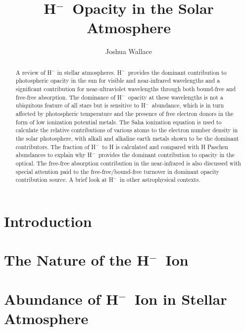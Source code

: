 \documentclass{emulateapj}
\def\h{H$^-$}
\begin{document}
\title{\h\ Opacity in the Solar Atmosphere}

\author{Joshua Wallace}


\begin{abstract}
A review of H$^-$ in stellar atmospheres. \h\ provides the dominant
contribution to photospheric opacity in the sun for visible and
near-infrared wavelengths and a significant contribution for
near-ultraviolet wavelengths through both bound-free and free-free absorption.  The dominance of \h\ opacity at these
wavelengths is not a ubiquitous feature of all stars but is sensitive
to \h\ abundance, which is in turn affected by photospheric
temperature and the presence of free electron donors in the form of
low ionization potential metals.  The Saha ionization equation is used
to calculate the relative contributions of various atoms to the
electron number density in the solar photosphere, with alkali and alkaline earth metals shown
to be the dominant contributors.  The fraction of \h\ to H is
calculated and compared with H Paschen abundances to explain why
\h\ provides the dominant contribution to opacity in the optical.
The free-free absorption contribution in the near-infrared is also
discussed with special attention paid to the free-free/bound-free
turnover in dominant opacity contribution source.  A brief look at
\h\ in other astrophysical contexts.
\end{abstract}


\section{Introduction}


%

\section{The Nature of the \h\ Ion}


\section{Abundance of \h\ Ion in Stellar Atmosphere}

\end{document}
